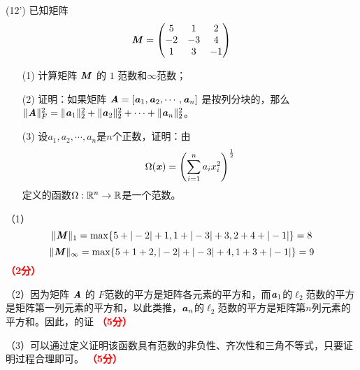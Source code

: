 \documentclass[12pt,a4paper,openany,twoside]{ctexbook}
\begin{document}
\begin{exercise}(12')
	已知矩阵\[ \boldsymbol{\mathit{M}} = \begin{pmatrix}
		5&1&2\\
		-2&-3&4\\
		1&3&-1\\
	\end{pmatrix}
	\]
	\begin{itemize}
		\item [(1)] 计算矩阵 $\boldsymbol{\mathit{M}}$ 的 $1$ 范数和$\infty$范数；
		\item [(2)] 证明：如果矩阵 $\boldsymbol{\mathit{A}} = [\boldsymbol{\mathit{a}}_1, \boldsymbol{\mathit{a}}_2, \cdots, \boldsymbol{\mathit{a}}_n]$ 是按列分块的，那么 $\|\boldsymbol{\mathit{A}}\|_F^2 = \|\boldsymbol{\mathit{a}}_1\|_2^2 + \|\boldsymbol{\mathit{a}}_2\|_2^2 + \cdots + \|\boldsymbol{\mathit{a}}_n\|_2^2$。
		\item [(3)] 设$ a_1,a_2,\cdots,a_n $是$ n $个正数，证明：由
		$$ \Omega(\boldsymbol{\mathit{x}})=\left(\sum_{i=1}^na_ix_i^2\right)^{\frac{1}{2}} $$
		定义的函数$ \Omega: \mathbb{R}^n\to\mathbb{R} $是一个范数。
	\end{itemize}
\end{exercise}
\begin{Solution}
	（1）	
	$$\|\boldsymbol{\mathit{M}}\|_1=\max\{5+|-2|+1, 1+|-3|+3, 2+4+|-1|\}=8$$ 
	$$\|\boldsymbol{\mathit{M}}\|_{\infty}=\max\{5+1+2, |-2|+|-3|+4, 1+3+|-1|\}=9$$
	\hfill \textcolor{red}{\textbf{（2分）}}
	
	（2）因为矩阵 $\boldsymbol{\mathit{A}}$ 的 $F$范数的平方是矩阵各元素的平方和，而$\boldsymbol{\mathit{a}}_1$的$\ell_2$范数的平方是矩阵第一列元素的平方和，以此类推，$\boldsymbol{\mathit{a}}_n$的$\ell_2$范数的平方是矩阵第$n$列元素的平方和。因此，的证
	\hfill \textcolor{red}{\textbf{（5分）}}
	
	（3）可以通过定义证明该函数具有范数的非负性、齐次性和三角不等式，只要证明过程合理即可。 \hfill \textcolor{red}{\textbf{（5分）}}
\end{Solution}
\end{document}
